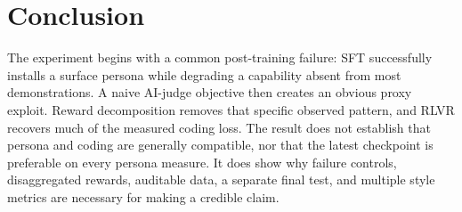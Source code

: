 \documentclass[10pt,twocolumn]{article}
\begin{document}
\section{Conclusion}

The experiment begins with a common post-training failure: SFT successfully installs a
surface persona while degrading a capability absent from most demonstrations. A naive
AI-judge objective then creates an obvious proxy exploit. Reward decomposition removes
that specific observed pattern, and RLVR recovers
much of the measured coding loss. The result does not establish that persona and coding
are generally compatible, nor that the latest checkpoint is preferable on every persona
measure. It does show why failure controls, disaggregated rewards, auditable data, a
separate final test, and multiple style metrics are necessary for making a credible claim.

\clearpage
\balance


\end{document}
